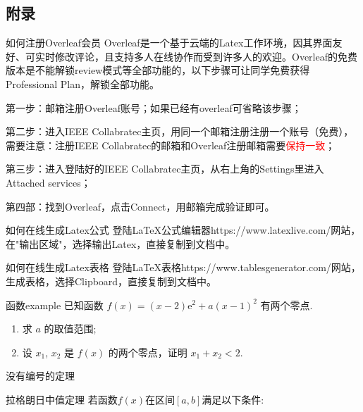 \clearpage
\begin{appendices}
\section{附录}

\begin{mybox}{如何注册Overleaf会员}
Overleaf是一个基于云端的Latex工作环境，因其界面友好、可实时修改评论，且支持多人在线协作而受到许多人的欢迎。Overleaf的免费版本是不能解锁review模式等全部功能的，以下步骤可让同学免费获得Professional Plan，解锁全部功能。

第一步：邮箱注册Overleaf账号；如果已经有overleaf可省略该步骤；

第二步：进入IEEE Collabratec主页，用同一个邮箱注册注册一个账号（免费），需要注意：注册IEEE Collabratec的邮箱和Overleaf注册邮箱需要\textcolor{red}{保持一致}；

第三步：进入登陆好的IEEE Collabratec主页，从右上角的Settings里进入Attached services；

第四部：找到Overleaf，点击Connect，用邮箱完成验证即可。
\end{mybox}

\begin{mybox}{如何在线生成Latex公式}
登陆{LaTeX公式编辑器}{https://www.latexlive.com/}网站，在"输出区域"，选择输出Latex，直接复制到文档中。
\end{mybox}

\begin{mybox}{如何在线生成Latex表格}
登陆{LaTeX表格}{https://www.tablesgenerator.com/}网站，生成表格，选择Clipboard，直接复制到文档中。
\end{mybox}

\begin{question}{函数}{example}
已知函数 $ f(x) = (x - 2)\mathrm{e}^{2} + a (x - 1)^{2} $ 有两个零点.
\begin{enumerate}[label=(\arabic*)]
  \item 求 $ a $ 的取值范围;
  \item 设 $ x_{1} $, $ x_{2} $ 是 $ f(x) $ 的两个零点，证明 $ x_{1} + x_{2} < 2 $.
\end{enumerate}
\end{question}


\begin{mytheo*}{}
没有编号的定理
\end{mytheo*}

\begin{mytheo}[label=myownlabel]{拉格朗日中值定理}{}
若函数$f(x)$在区间$[a,b]$满足以下条件: 　　


\end{mytheo}
\end{appendices}
